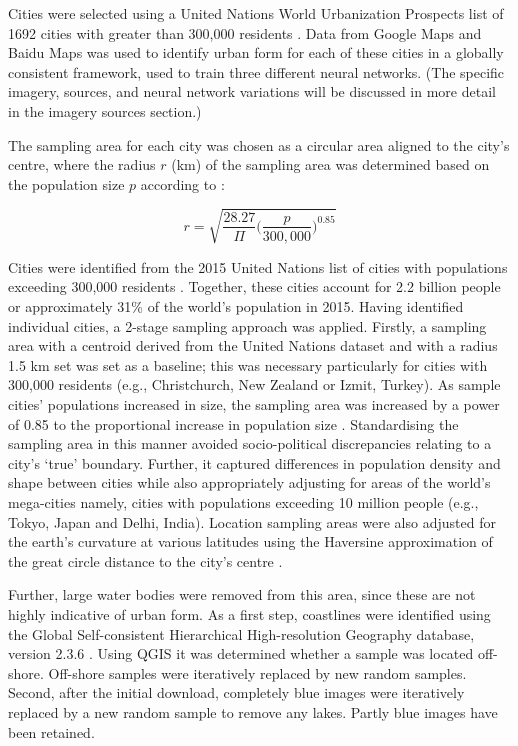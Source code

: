 \documentclass[sageh,times]{sagej}
\begin{document}
Cities were selected using a United Nations World Urbanization Prospects list of 1692 cities with greater than 300,000 residents \citep{UN2014}. Data from Google Maps and Baidu Maps was used to identify urban form for each of these cities in a globally consistent framework, used to train three different neural networks. (The specific imagery, sources, and neural network variations will be discussed in more detail in the imagery sources section.)

The sampling area for each city was chosen as a circular area aligned to the city's centre, where the radius $r$ (km) of the sampling area was determined based on the population size $p$ according to \cite{Barthelemy2016}:

\begin{equation}
r = \sqrt{ \frac{28.27}{\Pi} \bigg( \frac{p}{300,000}  \bigg)^{0.85} }
\end{equation}

Cities were identified from the 2015 United Nations list of cities with populations exceeding 300,000 residents \citep{UN2014}. Together, these cities account for 2.2 billion people or approximately 31\% of the world's population in 2015. Having identified individual cities, a 2-stage sampling approach was applied. Firstly, a sampling area with a centroid derived from the United Nations dataset and with a radius 1.5 km set was set as a baseline; this was necessary particularly for cities with 300,000 residents (e.g., Christchurch, New Zealand or Izmit, Turkey). As sample cities' populations increased in size, the sampling area was increased by a power of 0.85 to the proportional increase in population size \citep{Barthelemy2016}. Standardising the sampling area in this manner avoided socio-political discrepancies relating to a city's `true' boundary. Further, it captured differences in population density and shape between cities while also appropriately adjusting for areas of the world's mega-cities namely, cities with populations exceeding 10 million people (e.g., Tokyo, Japan and Delhi, India). Location sampling areas were also adjusted for the earth's curvature at various latitudes using the Haversine approximation of the great circle distance to the city's centre \citep{Sinnott1984}. 

Further, large water bodies were removed from this area, since these are not highly indicative of urban form. As a first step, coastlines were identified using the Global Self-consistent Hierarchical High-resolution Geography database, version 2.3.6 \citep{Wessel1996}. Using QGIS \citep{QGIS2009} it was determined whether a sample was located off-shore. Off-shore samples were iteratively replaced by new random samples. Second, after the initial download, completely blue images were iteratively replaced by a new random sample to remove any lakes. Partly blue images have been retained.
\end{document}
